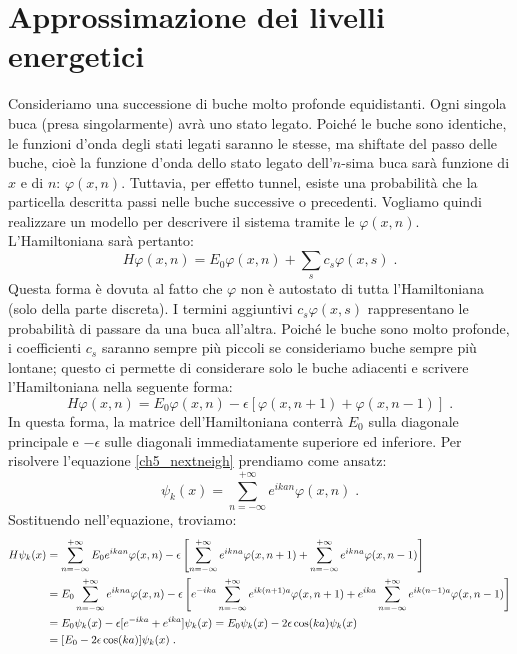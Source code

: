\documentclass[10pt,a4paper]{report}
\theoremstyle{definition}
\numberwithin{equation}{section}
\begin{document}
\section{Approssimazione dei livelli energetici}
Consideriamo una successione di buche molto profonde equidistanti. Ogni singola buca (presa singolarmente) avrà uno stato legato. Poiché le buche sono identiche, le funzioni d'onda degli stati legati saranno le stesse, ma shiftate del passo delle buche, cioè la funzione d'onda dello stato legato dell'$n$-sima buca sarà funzione di $x$ e di $n$: $\varphi(x,n)$. Tuttavia, per effetto tunnel, esiste una probabilità che la particella descritta passi nelle buche successive o precedenti. Vogliamo quindi realizzare un modello per descrivere il sistema tramite le $\varphi(x,n)$. L'Hamiltoniana sarà pertanto:
\begin{equation}
H\varphi(x,n)=E_0\varphi(x,n)+\sum_{s}c_s\varphi(x,s)\;.
\end{equation}
Questa forma è dovuta al fatto che $\varphi$ non è autostato di tutta l'Hamiltoniana (solo della parte discreta). I termini aggiuntivi $c_s\varphi(x,s)$ rappresentano le probabilità di passare da una buca all'altra. Poiché le buche sono molto profonde, i coefficienti $c_s$ saranno sempre più piccoli se consideriamo buche sempre più lontane; questo ci permette di considerare solo le buche adiacenti e scrivere l'Hamiltoniana nella seguente forma:
\begin{equation}
H\varphi(x,n)=E_0\varphi(x,n)-\epsilon[\varphi(x,n+1)+\varphi(x,n-1)]\;. \label{ch5_nextneigh}
\end{equation}
In questa forma, la matrice dell'Hamiltoniana conterrà $E_0$ sulla diagonale principale e $-\epsilon$ sulle diagonali immediatamente superiore ed inferiore. Per risolvere l'equazione \eqref{ch5_nextneigh} prendiamo come ansatz:
\begin{equation}
\psi_k(x)=\sum_{n=-\infty}^{+\infty} e^{ikan}\varphi(x,n)\;.
\end{equation}
Sostituendo nell'equazione, troviamo:
\begin{align}
H\psi_k(x) &= \sum_{n=-\infty}^{+\infty} E_0e^{ikan}\varphi(x,n)-\epsilon\left[\sum_{n=-\infty}^{+\infty}e^{ikna}\varphi(x,n+1)+\sum_{n=-\infty}^{+\infty}e^{ikna}\varphi(x,n-1)\right] \notag \\
&= E_0\sum_{n=-\infty}^{+\infty}e^{ikna}\varphi(x,n)-\epsilon\left[e^{-ika}\sum_{n=-\infty}^{+\infty} e^{ik(n+1)a}\varphi(x,n+1)+e^{ika}\sum_{n=-\infty}^{+\infty}e^{ik(n-1)a}\varphi(x,n-1)\right] \notag \\
&= E_0\psi_k(x)-\epsilon[e^{-ika}+e^{ika}]\psi_k(x) = E_0\psi_k(x)-2\epsilon\cos(ka)\psi_k(x)  \notag \\
&= [E_0-2\epsilon\cos(ka)]\psi_k(x)\;.
\end{align}
\end{document}
